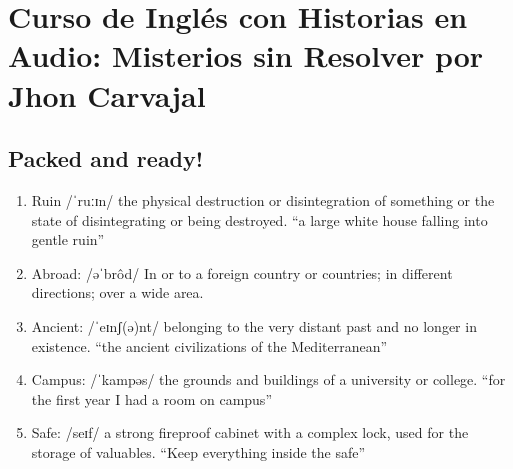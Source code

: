 \documentclass{article}
\begin{document}
    \section{Curso de Inglés con Historias en Audio: Misterios sin Resolver por Jhon Carvajal}
    \subsection{Packed and ready!}
    \begin{enumerate}
        \item Ruin /ˈruːɪn/ the physical destruction or disintegration of something or the state of disintegrating or being destroyed.
        “a large white house falling into gentle ruin”
        \item Abroad: /əˈbrôd/ In or to a foreign country or countries; in different directions; over a wide area.
        \item Ancient: /ˈeɪnʃ(ə)nt/ belonging to the very distant past and no longer in existence.
        “the ancient civilizations of the Mediterranean”
        \item Campus: /ˈkampəs/ the grounds and buildings of a university or college.
        “for the first year I had a room on campus”
        \item Safe: /seɪf/ a strong fireproof cabinet with a complex lock, used for the storage of valuables. “Keep everything inside the safe”
    \end{enumerate}
\end{document}
